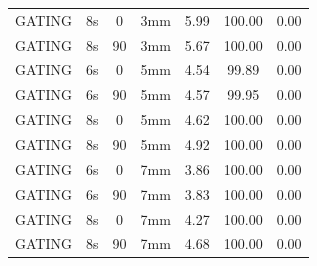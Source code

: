 \documentclass[type=dr, dr=rernat, accentcolor=tud7b,colorbacktitle, bigchapter, openright, twoside, 12pt ]{tudthesis}
\begin{document}
\begin{table}[H]
\begin{tabular}{|c||c|c|c||c|c|c|}
GATING & 8s & 0 & 3mm & 5.99 & 100.00 & 0.00 \\
GATING & 8s & 90 & 3mm & 5.67 & 100.00 & 0.00 \\
GATING & 6s & 0 & 5mm & 4.54 & 99.89 & 0.00 \\
GATING & 6s & 90 & 5mm & 4.57 & 99.95 & 0.00 \\
GATING & 8s & 0 & 5mm & 4.62 & 100.00 & 0.00 \\
GATING & 8s & 90 & 5mm & 4.92 & 100.00 & 0.00 \\
GATING & 6s & 0 & 7mm & 3.86 & 100.00 & 0.00 \\
GATING & 6s & 90 & 7mm & 3.83 & 100.00 & 0.00 \\
GATING & 8s & 0 & 7mm & 4.27 & 100.00 & 0.00 \\
GATING & 8s & 90 & 7mm & 4.68 & 100.00 & 0.00 \\
    \hline\hline 
  \end{tabular}
\end{table}

\newpage
\end{document}
